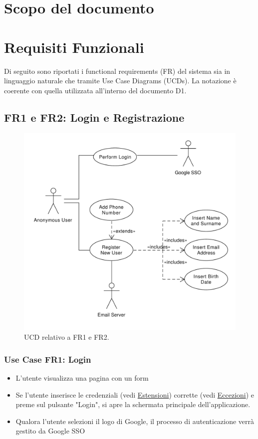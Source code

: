\documentclass[9pt]{extarticle}
\begin{document}
\customtitle



\tableofcontents
\newpage

\section{Scopo del documento}

\newpage

\section{Requisiti Funzionali}

Di seguito sono riportati i functional requirements (FR) del sistema sia in linguaggio naturale che tramite Use Case Diagrams (UCDs). La notazione è coerente con quella utilizzata all'interno del documento D1.



\subsection*{FR1 e FR2: Login e Registrazione} 

\begin{figure}[!htb]
	\centering
	\includegraphics[width=.7\linewidth]{./images/FR1-2.pdf}
	\caption{UCD relativo a FR1 e FR2.}
	\label{fig:UCD_FR1-2}
\end{figure}

\subsubsection*{Use Case FR1: Login}


\begin{itemize}
	\item L'utente visualizza una pagina con un form
	\item Se l'utente inserisce le credenziali (vedi  \hyperref[Estensioni]{Estensioni}) corrette (vedi \hyperref[Eccezioni]{Eccezioni}) e preme sul pulsante "Login", si apre la schermata principale dell'applicazione.
	\item Qualora l'utente selezioni il logo di Google, il processo di autenticazione verrà gestito da Google SSO
\end{itemize}
\end{document}

